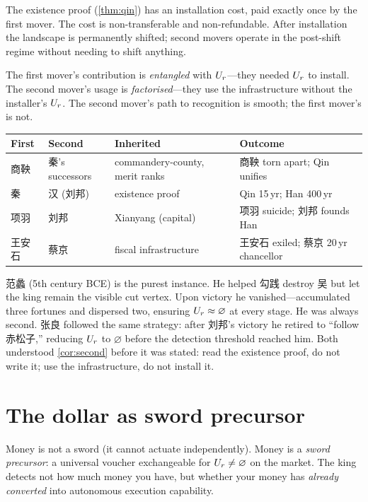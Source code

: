 The existence proof (\cref{thm:qin}) has an installation cost, paid
exactly once by the first mover.  The cost is non-transferable and
non-refundable.  After installation the landscape is permanently
shifted; second movers operate in the post-shift regime without
needing to shift anything.

The first mover's contribution is \emph{entangled} with $U_r$---they
needed $U_r$ to install.  The second mover's usage is
\emph{factorised}---they use the infrastructure without the
installer's $U_r$.  The second mover's path to recognition is smooth;
the first mover's is not.

\begin{center}
\renewcommand{\arraystretch}{1.25}
\begin{tabular}{@{}llp{3.5cm}p{4.5cm}@{}}
\toprule
\textbf{First} & \textbf{Second} & \textbf{Inherited} &
\textbf{Outcome} \\
\midrule
商鞅 & 秦's successors & commandery-county, merit ranks &
  商鞅 torn apart; Qin unifies \\
秦 & 汉 (刘邦) & existence proof & Qin 15\,yr; Han 400\,yr \\
项羽 & 刘邦 & Xianyang (capital) & 项羽 suicide; 刘邦 founds Han \\
王安石 & 蔡京 & fiscal infrastructure & 王安石 exiled; 蔡京 20\,yr
  chancellor \\
\bottomrule
\end{tabular}
\end{center}

范蠡 (5th century BCE) is the purest instance.  He helped 勾践 destroy
吴 but let the king remain the visible cut vertex.  Upon victory he
vanished---accumulated three fortunes and dispersed two, ensuring
$U_r \approx \varnothing$ at every stage.  He was always second.
张良 followed the same strategy: after 刘邦's victory he retired to
``follow 赤松子,'' reducing $U_r$ to $\varnothing$ before the
detection threshold reached him.  Both understood \cref{cor:second}
before it was stated: read the existence proof, do not write it; use
the infrastructure, do not install it.

\section{The dollar as sword precursor}\label{sec:dollar}

Money is not a sword (it cannot actuate independently). Money is a
\emph{sword precursor}: a universal voucher exchangeable for
$U_r \neq \varnothing$ on the market. The king detects not how much
money you have, but whether your money has \emph{already converted}
into autonomous execution capability.

